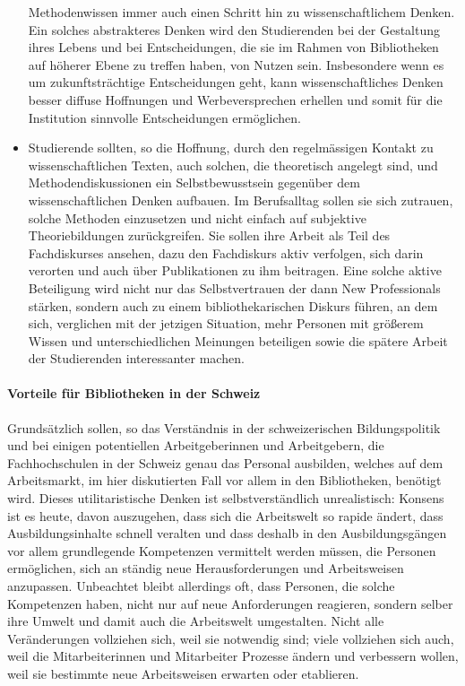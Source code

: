 \documentclass[a4paper,
fontsize=11pt,
oneside,
numbers=noperiodatend,
parskip=half-,
bibliography=totoc,
final
]{scrartcl}
\begin{document}
\begin{itemize}
  Methodenwissen immer auch einen Schritt hin zu wissenschaftlichem
  Denken. Ein solches abstrakteres Denken wird den Studierenden bei der
  Gestaltung ihres Lebens und bei Entscheidungen, die sie im Rahmen von
  Bibliotheken auf höherer Ebene zu treffen haben, von Nutzen sein.
  Insbesondere wenn es um zukunftsträchtige Entscheidungen geht, kann
  wissenschaftliches Denken besser diffuse Hoffnungen und
  Werbeversprechen erhellen und somit für die Institution sinnvolle
  Entscheidungen ermöglichen.
\item
  Studierende sollten, so die Hoffnung, durch den regelmässigen Kontakt
  zu wissenschaftlichen Texten, auch solchen, die theoretisch angelegt
  sind, und Methodendiskussionen ein Selbstbewusstsein gegenüber dem
  wissenschaftlichen Denken aufbauen. Im Berufsalltag sollen sie sich
  zutrauen, solche Methoden einzusetzen und nicht einfach auf subjektive
  Theoriebildungen zurückgreifen. Sie sollen ihre Arbeit als Teil des
  Fachdiskurses ansehen, dazu den Fachdiskurs aktiv verfolgen, sich
  darin verorten und auch über Publikationen zu ihm beitragen. Eine
  solche aktive Beteiligung wird nicht nur das Selbstvertrauen der dann
  New Professionals stärken, sondern auch zu einem bibliothekarischen
  Diskurs führen, an dem sich, verglichen mit der jetzigen Situation,
  mehr Personen mit größerem Wissen und unterschiedlichen Meinungen
  beteiligen sowie die spätere Arbeit der Studierenden interessanter
  machen.
\end{itemize}

\paragraph{Vorteile für Bibliotheken in der
Schweiz}\label{vorteile-fuxfcr-bibliotheken-in-der-schweiz}

Grundsätzlich sollen, so das Verständnis in der schweizerischen
Bildungspolitik und bei einigen potentiellen Arbeitgeberinnen und
Arbeitgebern, die Fachhochschulen in der Schweiz genau das Personal
ausbilden, welches auf dem Arbeitsmarkt, im hier diskutierten Fall vor
allem in den Bibliotheken, benötigt wird. Dieses utilitaristische Denken
ist selbstverständlich unrealistisch: Konsens ist es heute, davon
auszugehen, dass sich die Arbeitswelt so rapide ändert, dass
Ausbildungsinhalte schnell veralten und dass deshalb in den
Ausbildungsgängen vor allem grundlegende Kompetenzen vermittelt werden
müssen, die Personen ermöglichen, sich an ständig neue Herausforderungen
und Arbeitsweisen anzupassen. Unbeachtet bleibt allerdings oft, dass
Personen, die solche Kompetenzen haben, nicht nur auf neue Anforderungen
reagieren, sondern selber ihre Umwelt und damit auch die Arbeitswelt
umgestalten. Nicht alle Veränderungen vollziehen sich, weil sie
notwendig sind; viele vollziehen sich auch, weil die Mitarbeiterinnen
und Mitarbeiter Prozesse ändern und verbessern wollen, weil sie
bestimmte neue Arbeitsweisen erwarten oder etablieren.
\end{document}
